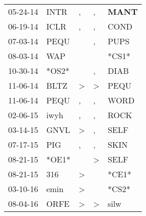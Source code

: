 \begin{supertabular}{p{0.07\textwidth}p{0.06\textwidth}p{0.02\textwidth}p{0.02\textwidth}p{0.06\textwidth}}
          05-24-14\textsuperscript{} &           INTR\textsuperscript{} &                , &                , &  \textbf{MANT\textsuperscript{}} \\
          06-19-14\textsuperscript{} &           ICLR\textsuperscript{} &                , &                , &           COND\textsuperscript{} \\
          07-03-14\textsuperscript{} &           PEQU\textsuperscript{} &                  &                , &           PUPS\textsuperscript{} \\
          08-03-14\textsuperscript{} &            WAP\textsuperscript{} &                  &                  &                            *CS1* \\
          10-30-14\textsuperscript{} &                            *OS2* &                  &                , &           DIAB\textsuperscript{} \\
          11-06-14\textsuperscript{} &           BLTZ\textsuperscript{} &     \textgreater &     \textgreater &           PEQU\textsuperscript{} \\
          11-06-14\textsuperscript{} &           PEQU\textsuperscript{} &                , &                , &           WORD\textsuperscript{} \\
          02-06-15\textsuperscript{} &           iwyh\textsuperscript{} &                , &                , &           ROCK\textsuperscript{} \\
          03-14-15\textsuperscript{} &           GNVL\textsuperscript{} &     \textgreater &                , &           SELF\textsuperscript{} \\
          07-17-15\textsuperscript{} &            PIG\textsuperscript{} &                , &                , &           SKIN\textsuperscript{} \\
          08-21-15\textsuperscript{} &                            *OE1* &                  &     \textgreater &           SELF\textsuperscript{} \\
          08-21-15\textsuperscript{} &            316\textsuperscript{} &     \textgreater &                  &                            *CE1* \\
          03-10-16\textsuperscript{} &           emin\textsuperscript{} &     \textgreater &                  &                            *CS2* \\
          08-04-16\textsuperscript{} &           ORFE\textsuperscript{} &     \textgreater &     \textgreater &           silw\textsuperscript{} \\

\end{supertabular}

